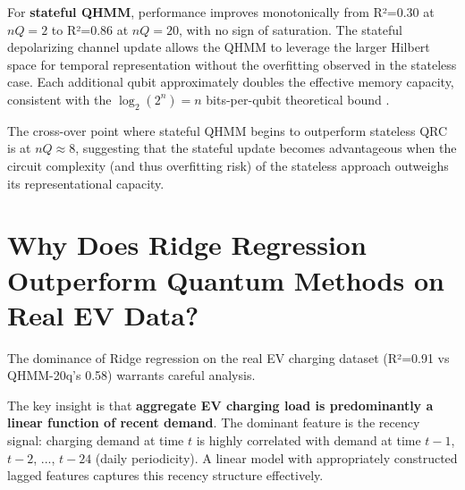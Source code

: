
For \textbf{stateful QHMM}, performance improves monotonically from
R²=0.30 at $nQ=2$ to R²=0.86 at $nQ=20$, with no sign of saturation.
The stateful depolarizing channel update allows the QHMM to leverage
the larger Hilbert space for temporal representation without the
overfitting observed in the stateless case. Each additional qubit
approximately doubles the effective memory capacity, consistent with
the $\log_2(2^n) = n$ bits-per-qubit theoretical bound
\citep{fujii2017keep}.



The cross-over point where stateful QHMM begins to outperform stateless
QRC is at $nQ \approx 8$, suggesting that the stateful update becomes
advantageous when the circuit complexity (and thus overfitting risk) of
the stateless approach outweighs its representational capacity.



\section{Why Does Ridge Regression Outperform Quantum Methods on Real EV Data?}
\label{sec:ridge_ev_analysis}


The dominance of Ridge regression on the real EV charging dataset
(R²=0.91 vs QHMM-20q's 0.58) warrants careful analysis.


The key insight is that \textbf{aggregate EV charging load is predominantly
a linear function of recent demand}. The dominant feature is the
recency signal: charging demand at time $t$ is highly correlated with
demand at time $t-1$, $t-2$, ..., $t-24$ (daily periodicity). A linear
model with appropriately constructed lagged features captures this
recency structure effectively.


